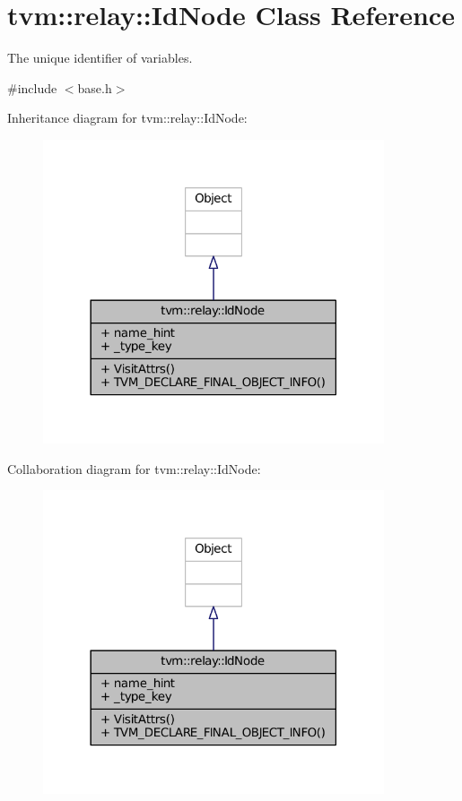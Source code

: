 \hypertarget{classtvm_1_1relay_1_1IdNode}{}\section{tvm\+:\+:relay\+:\+:Id\+Node Class Reference}
\label{classtvm_1_1relay_1_1IdNode}


The unique identifier of variables.  




{\ttfamily \#include $<$base.\+h$>$}



Inheritance diagram for tvm\+:\+:relay\+:\+:Id\+Node\+:
\nopagebreak
\begin{figure}[H]
\begin{center}
\leavevmode
\includegraphics[width=285pt]{classtvm_1_1relay_1_1IdNode__inherit__graph}
\end{center}
\end{figure}


Collaboration diagram for tvm\+:\+:relay\+:\+:Id\+Node\+:
\nopagebreak
\begin{figure}[H]
\begin{center}
\leavevmode
\includegraphics[width=285pt]{classtvm_1_1relay_1_1IdNode__coll__graph}
\end{center}
\end{figure}
